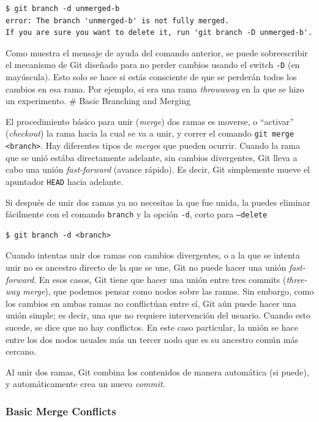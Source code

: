 \begin{lstlisting}
$ git branch -d unmerged-b
error: The branch 'unmerged-b' is not fully merged.
If you are sure you want to delete it, run 'git branch -D unmerged-b'.
\end{lstlisting}

Como muestra el mensaje de ayuda del comando anterior, se puede
sobreescribir el mecanismo de Git diseñado para no perder cambios usando
el switch \passthrough{\lstinline!-D!} (en mayúscula). Esto solo se hace
si estás consciente de que se perderán todos los cambios en esa rama.
Por ejemplo, si era una rama \emph{throwaway} en la que se hizo un
experimento. \# Basic Branching and Merging

El procedimiento básico para unir (\emph{merge}) dos ramas es moverse, o
``activar'' (\emph{checkout}) la rama hacia la cual se va a unir, y
correr el comando \passthrough{\lstinline!git merge <branch>!}. Hay
diferentes tipos de \emph{merge}s que pueden ocurrir. Cuando la rama que
se unió estába directamente adelante, sin cambios divergentes, Git lleva
a cabo una unión \emph{fast-forward} (avance rápido). Es decir, Git
simplemente mueve el apuntador \passthrough{\lstinline!HEAD!} hacia
adelante.

Si después de unir dos ramas ya no necesitas la que fue unida, la puedes
eliminar fácilmente con el comando \passthrough{\lstinline!branch!} y la
opción \passthrough{\lstinline!-d!}, corto para
\passthrough{\lstinline!–delete!}

\begin{lstlisting}
$ git branch -d <branch>
\end{lstlisting}

Cuando intentas unir dos ramas con cambios divergentes, o a la que se
intenta unir no es ancestro directo de la que se une, Git no puede hacer
una unión \emph{fast-forward}. En esos casos, Git tiene que hacer una
unión entre tres commits (\emph{three-way merge}), que podemos pensar
como nodos sobre las ramas. Sin embargo, como los cambios en ambas ramas
no conflictúan entre sí, Git aún puede hacer una unión simple; es decir,
una que no requiere intervención del usuario. Cuando esto sucede, se
dice que no hay conflictos. En este caso particular, la unión se hace
entre los dos nodos usuales más un tercer nodo que es su ancestro común
más cercano.

Al unir dos ramas, Git combina los contenidos de manera automática (si
puede), y automáticamente crea un nuevo \emph{commit}.

\subsubsection{Basic Merge Conflicts}

